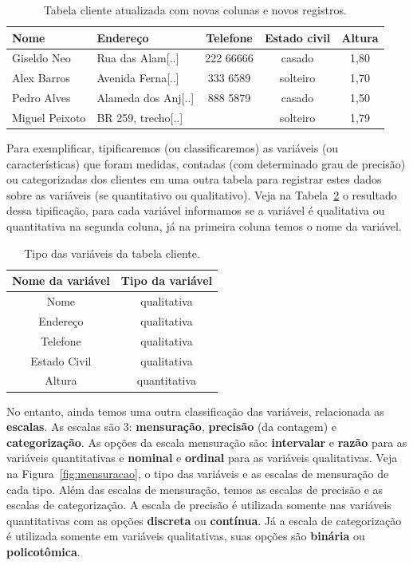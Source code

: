 \documentclass[a4paper,12pt]{book}
\begin{document}
\begin{table}
	\centering
	\caption{Tabela cliente atualizada com novas colunas e novos registros.}
	\begin{tabular}{|l|l|c|c|c|}
	\hline
	\textbf{Nome} & \textbf{Endereço} & \textbf{Telefone} & \textbf{Estado civil} & \textbf{Altura} \\
	\hline
	Giseldo Neo & Rua das Alam[..] & 222 66666 & casado & 1,80\\
	\hline
	Alex Barros & Avenida Ferna[..]& 333 6589 & solteiro & 1,70 \\
	\hline
	Pedro Alves & Alameda dos Anj[..]& 888 5879 & casado & 1,50 \\
	\hline
	Miguel Peixoto & BR 259, trecho[..]&  & solteiro & 1,79 \\
	\hline
	\end{tabular}
	\label{tbl:cliente_v2}
\end{table}

Para exemplificar, tipificaremos (ou classificaremos) as variáveis (ou  características) que foram medidas, contadas (com determinado grau de precisão) ou categorizadas dos clientes em uma outra tabela para registrar estes dados sobre as variáveis (se quantitativo ou qualitativo). Veja na Tabela~\ref{tbl:clienteclassificacao} o resultado dessa tipificação, para cada variável informamos se a variável é qualitativa ou quantitativa na segunda coluna, já na primeira coluna temos o nome da variável.

\begin{table}
	\centering
	\caption{Tipo das variáveis da tabela cliente.}
	\begin{tabular}{|c|c|}
		\hline
		\textbf{Nome da variável} &\textbf{Tipo da variável} \\
		\hline
		Nome & qualitativa \\
		\hline
		Endereço & qualitativa \\
		\hline
		Telefone & qualitativa \\
		\hline
		Estado Civil & qualitativa \\
		\hline
		Altura & quantitativa \\
		\hline
	\end{tabular}
	\label{tbl:clienteclassificacao}
\end{table}

No entanto, ainda temos uma outra classificação das variáveis, relacionada as \textbf{escalas}. As escalas são 3: \textbf{mensuração}, \textbf{precisão} (da contagem) e \textbf{categorização}. As opções da escala mensuração são: \textbf{intervalar} e \textbf{razão} para as variáveis quantitativas e \textbf{nominal} e \textbf{ordinal} para as variáveis qualitativas. Veja na Figura~\ref{fig:mensuracao}, o tipo das variáveis e as escalas de mensuração de cada tipo. Além das escalas de mensuração, temos as escalas de precisão e as escalas de categorização. A escala de precisão é utilizada somente nas variáveis quantitativas com as opções \textbf{discreta} ou \textbf{contínua}. Já a escala de categorização é utilizada somente em variáveis qualitativas, suas opções são \textbf{binária} ou \textbf{policotômica}.
\end{document}
